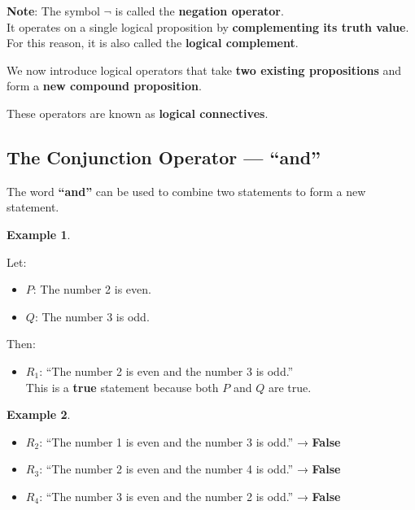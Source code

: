 \documentclass[
]{book}
\providecommand{\tightlist}{%
  \setlength{\itemsep}{0pt}\setlength{\parskip}{0pt}}
\theoremstyle{definition}
\theoremstyle{definition}
\newtheorem{example}{Example}[chapter]
\theoremstyle{definition}
\theoremstyle{definition}
\theoremstyle{remark}
\begin{document}
\textbf{Note}:
The symbol \(\lnot\) is called the \textbf{negation operator}.\\
It operates on a single logical proposition by \textbf{complementing its truth value}.\\
For this reason, it is also called the \textbf{logical complement}.

We now introduce logical operators that take \textbf{two existing propositions} and form a \textbf{new compound proposition}.

These operators are known as \textbf{logical connectives}.

\subsection{The Conjunction Operator --- ``and''}\label{the-conjunction-operator-and}

The word \textbf{``and''} can be used to combine two statements to form a new statement.

\begin{example}
\protect\hypertarget{exm:unnamed-chunk-16}{}\label{exm:unnamed-chunk-16}

Let:

\begin{itemize}
\tightlist
\item
  \(P\): The number 2 is even.
\item
  \(Q\): The number 3 is odd.
\end{itemize}

Then:

\begin{itemize}
\tightlist
\item
  \(R_1\): ``The number 2 is even and the number 3 is odd.''\\
  This is a \textbf{true} statement because both \(P\) and \(Q\) are true.
\end{itemize}

\end{example}

\begin{example}
\protect\hypertarget{exm:unnamed-chunk-17}{}\label{exm:unnamed-chunk-17}\leavevmode

\begin{itemize}
\tightlist
\item
  \(R_2\): ``The number 1 is even and the number 3 is odd.'' → \textbf{False}
\item
  \(R_3\): ``The number 2 is even and the number 4 is odd.'' → \textbf{False}
\item
  \(R_4\): ``The number 3 is even and the number 2 is odd.'' → \textbf{False}
\end{itemize}

\end{example}
\end{document}
